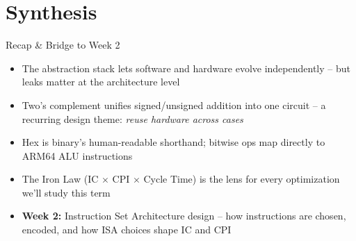 \documentclass[10pt, aspectratio=169]{beamer}
\begin{document}
\section{Synthesis}

\begin{frame}{Recap \& Bridge to Week 2}
\begin{itemize}
    \item The abstraction stack lets software and hardware evolve independently -- but leaks matter at the architecture level
    \item Two's complement unifies signed/unsigned addition into one circuit -- a recurring design theme: \emph{reuse hardware across cases}
    \item Hex is binary's human-readable shorthand; bitwise ops map directly to ARM64 ALU instructions
    \item The Iron Law (IC $\times$ CPI $\times$ Cycle Time) is the lens for every optimization we'll study this term
    \item \textbf{Week 2:} Instruction Set Architecture design -- how instructions are chosen, encoded, and how ISA choices shape IC and CPI
\end{itemize}
\end{frame}
\end{document}
